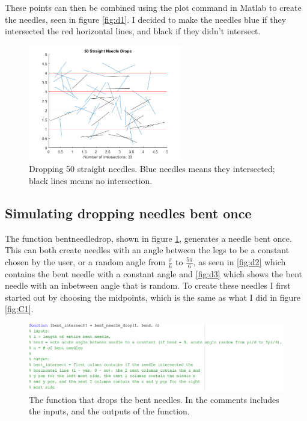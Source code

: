 \documentclass[11pt]{article}
\begin{document}
These points can then be combined using the plot command in Matlab to create the needles, seen in figure \ref{fig:d1}. I decided to make the needles blue if they intersected the red horizontal lines, and black if they didn't intersect.

\begin{figure}[H]
\includegraphics[width=0.6\textwidth]{straight.png}
\caption{Dropping 50 straight needles. Blue needles means they intersected; black lines means no intersection.}
\end{figure}
\label{fig:d1}

\subsection{Simulating dropping needles bent once}
The function bent\underline{\hspace{0.2cm}}needle\underline{\hspace{0.2cm}}drop, shown in figure \ref{fig:C5}, generates a needle bent once. This can both create needles with an angle between the legs to be a constant chosen by the user, or a random angle from $\frac{\pi}{6}$ to $\frac{5\pi}{6}$, as seen in \ref{fig:d2} which contains the bent needle with a constant angle and \ref{fig:d3} which shows the bent needle with an inbetween angle that is random. To create these needles I first started out by choosing the midpoints, which is the same as what I did in figure \ref{fig:C1}. 

\begin{figure}[H]
\begin{centering}
\includegraphics[scale=0.5]{f5.png}
\end{centering}
\caption{The function that drops the bent needles. In the comments includes the inputs, and the outputs of the function.}
\label{fig:C5}
\end{figure}
\end{document}
